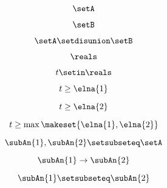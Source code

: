 {\begin{forslides}
        \begin{equation}
            \label{eq:feedback-060}
            \setA
        \end{equation}

        \begin{equation}
            \label{eq:feedback-061}
            \setB
        \end{equation}

        \begin{equation}
            \label{eq:feedback-062}
            \setA \setdisunion \setB
        \end{equation}

        \begin{equation}
            \label{eq:feedback-063}
            \reals
        \end{equation}

        \begin{equation}
            \label{eq:feedback-064}
            t \setin \reals
        \end{equation}

        \begin{equation}
            \label{eq:feedback-065}
            t \geq \elna{1}
        \end{equation}

        \begin{equation}
            \label{eq:feedback-066}
            t \geq \elna{2}
        \end{equation}

        \begin{equation}
            \label{eq:feedback-067}
            t \geq \max \makeset{ \elna{1}, \elna{2} }
        \end{equation}

        \begin{equation}
            \label{eq:feedback-068}
            \subAn{1}, \subAn{2} \setsubseteq \setA
        \end{equation}

        \begin{equation}
            \label{eq:feedback-069}
            \subAn{1} \to \subAn{2}
        \end{equation}

        \begin{equation}
            \label{eq:feedback-070}
            \subAn{1} \setsubseteq \subAn{2}
        \end{equation}


\end{forslides}}

